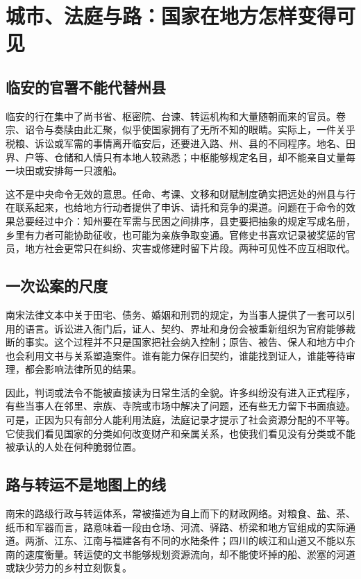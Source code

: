 \section{城市、法庭与路：国家在地方怎样变得可见}

\subsection{临安的官署不能代替州县}

临安的行在集中了尚书省、枢密院、台谏、转运机构和大量随朝而来的官员。卷宗、诏令与奏牍由此汇聚，似乎使国家拥有了无所不知的眼睛。实际上，一件关乎税粮、诉讼或军需的事情离开临安后，还要进入路、州、县的不同程序。地名、田界、户等、仓储和人情只有本地人较熟悉；中枢能够规定名目，却不能亲自丈量每一块田或安排每一只渡船。

这不是中央命令无效的意思。任命、考课、文移和财赋制度确实把远处的州县与行在联系起来，也给地方行动者提供了申诉、请托和竞争的渠道。问题在于命令的效果总要经过中介：知州要在军需与民困之间排序，县吏要把抽象的规定写成名册，乡里有力者可能协助征收，也可能为亲族争取变通。官修史书喜欢记录被奖惩的官员，地方社会更常只在纠纷、灾害或修建时留下片段。两种可见性不应互相取代。

\subsection{一次讼案的尺度}

南宋法律文本中关于田宅、债务、婚姻和刑罚的规定，为当事人提供了一套可以引用的语言。诉讼进入衙门后，证人、契约、界址和身份会被重新组织为官府能够裁断的事实。这个过程并不只是国家把社会纳入控制；原告、被告、保人和地方中介也会利用文书与关系塑造案件。谁有能力保存旧契约，谁能找到证人，谁能等待审理，都会影响法律所见的结果。

因此，判词或法令不能被直接读为日常生活的全貌。许多纠纷没有进入正式程序，有些当事人在邻里、宗族、寺院或市场中解决了问题，还有些无力留下书面痕迹。可是，正因为只有部分人能利用法庭，法庭记录才提示了社会资源分配的不平等。它使我们看见国家的分类如何改变财产和亲属关系，也使我们看见没有分类或不能被承认的人处在何种脆弱位置。

\subsection{路与转运不是地图上的线}

南宋的路级行政与转运体系，常被描述为自上而下的财政网络。对粮食、盐、茶、纸币和军器而言，路意味着一段由仓场、河流、驿路、桥梁和地方官组成的实际通道。两浙、江东、江南与福建各有不同的水陆条件；四川的峡江和山道又不能以东南的速度衡量。转运使的文书能够规划资源流向，却不能使坏掉的船、淤塞的河道或缺少劳力的乡村立刻恢复。

